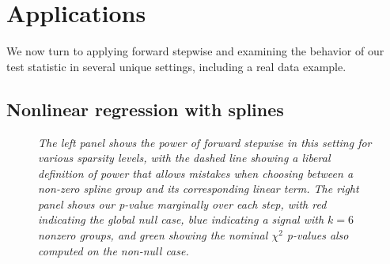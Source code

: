\documentclass{imsart}
\begin{document}
\section{Applications}
\label{sec:applications}
We now turn to applying forward stepwise and examining the behavior of
our test statistic in several unique settings, including a real data
example.

\subsection{Nonlinear regression with splines}

\begin{figure}
\begin{center}
\hspace{-15pt}
\caption{\small \it The left panel shows the power of forward stepwise
in this setting for various sparsity levels, with the dashed line
showing a liberal definition of power that allows mistakes when
choosing between a non-zero spline group and its corresponding linear
term.
The right panel shows our p-value marginally
over each step, with red indicating the global null case, blue
indicating a signal with $k=6$ nonzero groups, and green showing
the nominal $\chi^2$ p-values also computed on the non-null case.}
\label{fig:spline}
\end{center}
\end{figure}
\end{document}

